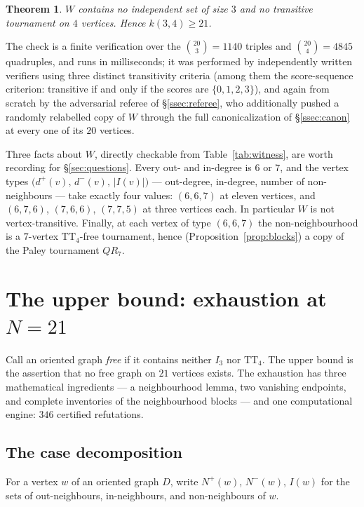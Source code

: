 \documentclass[11pt]{amsart}
\newcommand{\TT}[1]{\mathrm{TT}_{#1}}
\newcommand{\I}[1]{I_{#1}}
\newcommand{\Np}{N^{+}}
\newcommand{\Nm}{N^{-}}
\newcommand{\NI}{I}
\theoremstyle{plain}
\newtheorem{theorem}{Theorem}[section]
\theoremstyle{definition}
\theoremstyle{remark}
\begin{document}
\begin{theorem}\label{thm:witness}
$W$ contains no independent set of size $3$ and no transitive tournament
on $4$ vertices. Hence $k(3,4)\ge 21$.
\end{theorem}

The check is a finite verification over the $\binom{20}{3}=1140$ triples
and $\binom{20}{4}=4845$ quadruples, and runs in milliseconds; it was
performed by independently written verifiers using three distinct
transitivity criteria (among them the score-sequence criterion:
transitive if and only if the scores are $\{0,1,2,3\}$), and again from
scratch by the adversarial referee of \S\ref{ssec:referee}, who
additionally pushed a randomly relabelled copy of $W$ through the full
canonicalization of \S\ref{ssec:canon} at every one of its $20$
vertices.

Three facts about $W$, directly checkable from Table~\ref{tab:witness},
are worth recording for \S\ref{sec:questions}. Every out- and in-degree
is $6$ or $7$, and the vertex types
$\bigl(d^+(v),\,d^-(v),\,|\NI(v)|\bigr)$ --- out-degree, in-degree,
number of non-neighbours --- take exactly four values: $(6,6,7)$ at
eleven vertices, and $(6,7,6)$, $(7,6,6)$, $(7,7,5)$ at three vertices
each. In particular $W$ is not vertex-transitive. Finally, at each
vertex of type $(6,6,7)$ the non-neighbourhood is a $7$-vertex
$\TT{4}$-free tournament, hence (Proposition~\ref{prop:blocks}) a copy
of the Paley tournament $QR_7$.

\section{The upper bound: exhaustion at $N=21$}\label{sec:upper}

Call an oriented graph \emph{free} if it contains neither $\I3$ nor
$\TT{4}$. The upper bound is the assertion that no free graph on $21$
vertices exists. The exhaustion has three mathematical ingredients ---
a neighbourhood lemma, two vanishing endpoints, and complete
inventories of the neighbourhood blocks --- and one computational
engine: $346$ certified refutations.

\subsection{The case decomposition}\label{ssec:decomp}

For a vertex $w$ of an oriented graph $D$, write $\Np(w)$, $\Nm(w)$,
$\NI(w)$ for the sets of out-neighbours, in-neighbours, and
non-neighbours of $w$.
\end{document}

